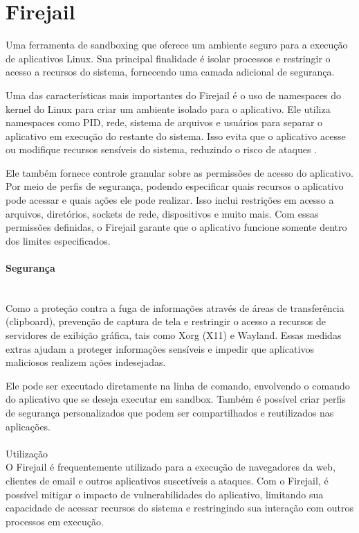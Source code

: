 \section{Firejail}

Uma ferramenta de sandboxing que oferece um ambiente seguro para a execução de aplicativos Linux. Sua principal finalidade é isolar processos e restringir o acesso a recursos do sistema, fornecendo uma camada adicional de segurança.

Uma das características mais importantes do Firejail é o uso de namespaces do kernel do Linux para criar um ambiente isolado para o aplicativo. Ele utiliza namespaces como PID, rede, sistema de arquivos e usuários para separar o aplicativo em execução do restante do sistema. Isso evita que o aplicativo acesse ou modifique recursos sensíveis do sistema, reduzindo o risco de ataques \cite{firejail-archwiki}.

Ele também fornece controle granular sobre as permissões de acesso do aplicativo. Por meio de perfis de segurança, podendo especificar quais recursos o aplicativo pode acessar e quais ações ele pode realizar. Isso inclui restrições em acesso a arquivos, diretórios, sockets de rede, dispositivos e muito mais. Com essas permissões definidas, o Firejail garante que o aplicativo funcione somente dentro dos limites especificados.

\paragraph*{Segurança}\mbox{}\\
 Como a proteção contra a fuga de informações através de áreas de transferência (clipboard), prevenção de captura de tela e restringir o acesso a recursos de servidores de exibição gráfica, tais como Xorg (X11) e Wayland. Essas medidas extras ajudam a proteger informações sensíveis e impedir que aplicativos maliciosos realizem ações indesejadas.
 
Ele pode ser executado diretamente na linha de comando, envolvendo o comando do aplicativo que se deseja executar em sandbox. Também é possível criar perfis de segurança personalizados que podem ser compartilhados e reutilizados nas aplicações.

\paragraph*{}\mbox{Utilização}\\
O Firejail é frequentemente utilizado para a execução de navegadores da web, clientes de email e outros aplicativos suscetíveis a ataques. Com o Firejail, é possível mitigar o impacto de vulnerabilidades do aplicativo, limitando sua capacidade de acessar recursos do sistema e restringindo sua interação com outros processos em execução.